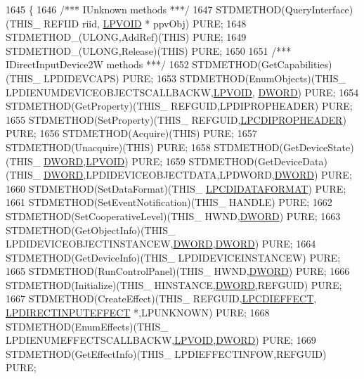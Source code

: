 \begin{DoxyCode}
1645 \{
1646     \textcolor{comment}{/*** IUnknown methods ***/}
1647     STDMETHOD(QueryInterface)(THIS\_ REFIID riid, \hyperlink{a00003_ae611cd6871649dbfe37273a0253d5e61}{LPVOID} * ppvObj) PURE;
1648     STDMETHOD\_(ULONG,AddRef)(THIS) PURE;
1649     STDMETHOD\_(ULONG,Release)(THIS) PURE;
1650 
1651     \textcolor{comment}{/*** IDirectInputDevice2W methods ***/}
1652     STDMETHOD(GetCapabilities)(THIS\_ LPDIDEVCAPS) PURE;
1653     STDMETHOD(EnumObjects)(THIS\_ LPDIENUMDEVICEOBJECTSCALLBACKW,\hyperlink{a00003_ae611cd6871649dbfe37273a0253d5e61}{LPVOID},
      \hyperlink{a00003_a50e15ae51c87ae06ab29c8148cb5f36c}{DWORD}) PURE;
1654     STDMETHOD(GetProperty)(THIS\_ REFGUID,LPDIPROPHEADER) PURE;
1655     STDMETHOD(SetProperty)(THIS\_ REFGUID,\hyperlink{a00003_aa73246465a32c316894f99e088564911}{LPCDIPROPHEADER}) PURE;
1656     STDMETHOD(Acquire)(THIS) PURE;
1657     STDMETHOD(Unacquire)(THIS) PURE;
1658     STDMETHOD(GetDeviceState)(THIS\_ \hyperlink{a00003_a50e15ae51c87ae06ab29c8148cb5f36c}{DWORD},\hyperlink{a00003_ae611cd6871649dbfe37273a0253d5e61}{LPVOID}) PURE;
1659     STDMETHOD(GetDeviceData)(THIS\_ \hyperlink{a00003_a50e15ae51c87ae06ab29c8148cb5f36c}{DWORD},LPDIDEVICEOBJECTDATA,LPDWORD,\hyperlink{a00003_a50e15ae51c87ae06ab29c8148cb5f36c}{DWORD}) PURE;
1660     STDMETHOD(SetDataFormat)(THIS\_ \hyperlink{a00003_ab7e0c3254f09795a4a2176cac228ba7d}{LPCDIDATAFORMAT}) PURE;
1661     STDMETHOD(SetEventNotification)(THIS\_ HANDLE) PURE;
1662     STDMETHOD(SetCooperativeLevel)(THIS\_ HWND,\hyperlink{a00003_a50e15ae51c87ae06ab29c8148cb5f36c}{DWORD}) PURE;
1663     STDMETHOD(GetObjectInfo)(THIS\_ LPDIDEVICEOBJECTINSTANCEW,\hyperlink{a00003_a50e15ae51c87ae06ab29c8148cb5f36c}{DWORD},\hyperlink{a00003_a50e15ae51c87ae06ab29c8148cb5f36c}{DWORD}) PURE;
1664     STDMETHOD(GetDeviceInfo)(THIS\_ LPDIDEVICEINSTANCEW) PURE;
1665     STDMETHOD(RunControlPanel)(THIS\_ HWND,\hyperlink{a00003_a50e15ae51c87ae06ab29c8148cb5f36c}{DWORD}) PURE;
1666     STDMETHOD(Initialize)(THIS\_ HINSTANCE,\hyperlink{a00003_a50e15ae51c87ae06ab29c8148cb5f36c}{DWORD},REFGUID) PURE;
1667     STDMETHOD(CreateEffect)(THIS\_ REFGUID,\hyperlink{a00003_a7913240b16286bfdcb811a35a982b236}{LPCDIEFFECT},
      \hyperlink{a00003_ac8278f319038d7db709c5ea828830fb9}{LPDIRECTINPUTEFFECT} *,LPUNKNOWN) PURE;
1668     STDMETHOD(EnumEffects)(THIS\_ LPDIENUMEFFECTSCALLBACKW,\hyperlink{a00003_ae611cd6871649dbfe37273a0253d5e61}{LPVOID},\hyperlink{a00003_a50e15ae51c87ae06ab29c8148cb5f36c}{DWORD}) PURE;
1669     STDMETHOD(GetEffectInfo)(THIS\_ LPDIEFFECTINFOW,REFGUID) PURE;

\end{DoxyCode}
